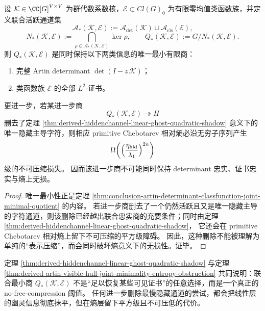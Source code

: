 \begin{theorem}\label{thm:derived-artin-visible-hull-joint-minimality-entropy-obstruction}
设 \(\mathcal K\in \CC[G]^{V\times V}\) 为群代数系数核，\(\mathcal E\subset Cl(G)_0\) 为有限零均值类函数族，并定义联合活跃通道集
\[
\mathcal A_\ast(\mathcal K,\mathcal E)
:=
\mathcal A_{\det}(\mathcal K)\cup \mathcal A_{\mathrm{cls}}(\mathcal E),
\]
\[
N_\ast(\mathcal K,\mathcal E)
:=
\bigcap_{\rho\in\mathcal A_\ast(\mathcal K,\mathcal E)}\ker\rho,
\qquad
Q_\ast(\mathcal K,\mathcal E):=G/N_\ast(\mathcal K,\mathcal E).
\]
则 \(Q_\ast(\mathcal K,\mathcal E)\) 是同时保持以下两类信息的唯一最小有限商：
\begin{enumerate}
\normalfont
  \item 完整 Artin determinant \(\det(I-z\,\mathcal K)\)；
  \item 类函数族 \(\mathcal E\) 的全部 \(L^2\)-证书。
\end{enumerate}
更进一步，若某进一步商
\[
Q_\ast(\mathcal K,\mathcal E)\twoheadrightarrow H
\]
删去了定理 \ref{thm:derived-hiddenchannel-linear-ghost-quadratic-shadow}
意义下的唯一隐藏主导字符，则相应 primitive Chebotarev 相对熵必沿无穷子序列产生
\[
\Omega\!\left(
\Bigl(\frac{\eta_{\mathrm{hid}}}{\lambda_1}\Bigr)^{2n}
\right)
\]
级的不可压缩损失。
因而该进一步商不可能同时保持 determinant 忠实、证书忠实与熵上无损。
\end{theorem}

\begin{proof}
唯一最小性正是定理
\ref{thm:conclusion-artin-determinant-classfunction-joint-minimal-quotient}
的内容。
若进一步商删去了一个仍然活跃且又是唯一隐藏主导的字符通道，则该删除已经越出联合忠实商的充要条件；同时由定理
\ref{thm:derived-hiddenchannel-linear-ghost-quadratic-shadow}，
它还会在 primitive Chebotarev 相对熵上留下不可压缩的平方级障碍。
因此，这种删除不能被理解为单纯的“表示压缩”，而会同时破坏熵意义下的无损性。证毕。
\end{proof}

\begin{remark}[最慢隐藏通道不可被无代价删除]\label{rem:derived-hiddenchannel-visible-hull-no-free-compression}
定理 \ref{thm:derived-hiddenchannel-linear-ghost-quadratic-shadow} 与定理
\ref{thm:derived-artin-visible-hull-joint-minimality-entropy-obstruction}
共同说明：联合最小商 \(Q_\ast(\mathcal K,\mathcal E)\) 不是“足以恢复某些可见证书”的任意选择，而是一个真正的 no-free-compression 阈值。
任何进一步删除最慢隐藏通道的尝试，都会把线性层的幽灵信息彻底抹平，但在熵层留下平方级且不可压低的代价。
\end{remark}

\endinput
